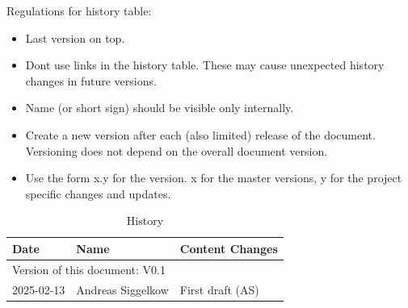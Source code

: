 Regulations for history table:
\begin{itemize}
  \item Last version on top.
  \item Dont use links in the history table. These may cause unexpected history changes in future versions.
  \item Name (or short sign) should be visible only internally.
  \item Create a new version after each (also limited) release of the document. Versioning does not depend on the overall document version.
  \item Use the form x.y for the version. x for the master versions, y for the project specific changes and updates.
\end{itemize}

\begin{table}[H]
\caption{History}
\label{tab:dechistory01}
\centering
\begin{tabularx}{\textwidth}{|X |X |X |}
  \hline
  Date & Name & Content Changes \\
  \hline
  \multicolumn{3}{|l|}{Version of this document: V0.1} \\
  \hline
  2025-02-13 & Andreas Siggelkow & First draft (AS) \\
  \hline
\end{tabularx}
\end{table}
